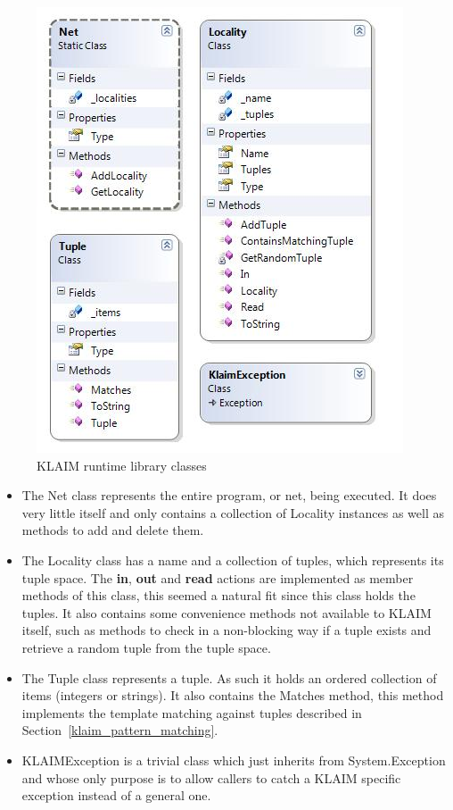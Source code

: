 	\begin{figure}[h!]
		\centering
		\includegraphics[scale=0.8]{klaim_runtime.jpg}
		\caption{KLAIM runtime library classes}
		\label{fig:klaim_runtime}
	\end{figure}
	
	\begin{itemize}
	
	\item The \textsf{Net} class represents the entire program, or net, being 
	executed. It does very little itself and only contains a collection of 
	\textsf{Locality} instances as well as methods to add and delete them. 
	
	\item The \textsf{Locality} class has a name and a collection of tuples, 
	which 
	represents its tuple space. The \textbf{in}, \textbf{out} and \textbf{read} 
	actions are implemented as member methods of this class, this seemed a 
	natural fit since this class holds the tuples. It also contains some 
	convenience methods not available to KLAIM itself, such as methods to check 
	in a non-blocking way if a tuple exists and retrieve a random tuple from the 
	tuple space.

	\item The \textsf{Tuple} class represents a tuple. As such it holds an 
	ordered collection of items (integers or strings). It also contains the 
	\textsf{Matches} method, this method implements the template matching 
	against tuples described in Section~\ref{klaim_pattern_matching}.
	
	\item \textsf{KLAIMException} is a trivial class which just inherits from 
	\textsf{System.Exception} and whose only purpose is to allow callers to 
	catch a KLAIM specific exception instead of a general one.
	
	\end{itemize}
	
